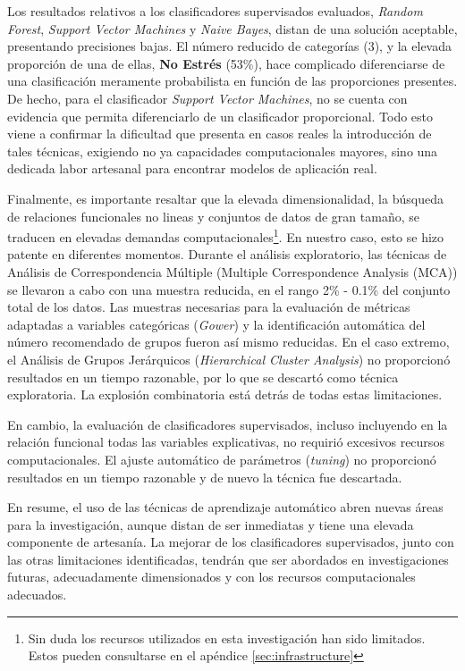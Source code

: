 \documentclass[a4paper, 11pt]{article}
\begin{document}
Los resultados relativos a los clasificadores supervisados evaluados, \textit{Random Forest}, 
\textit{Support Vector Machines} y \textit{Naive Bayes}, distan de una solución aceptable,
presentando precisiones bajas. El número reducido de categorías (3), y la elevada proporción
de una de ellas, \textbf{No Estrés} (53\%), hace complicado diferenciarse de una clasificación
meramente probabilista en función de las proporciones presentes. De hecho, para el 
clasificador \textit{Support Vector Machines}, no se cuenta con evidencia que permita 
diferenciarlo de un clasificador proporcional. Todo esto viene a confirmar la dificultad 
que presenta en casos reales la introducción de tales técnicas, exigiendo no ya capacidades
computacionales mayores, sino una dedicada labor artesanal para encontrar modelos de
aplicación real.

Finalmente, es importante resaltar que la elevada dimensionalidad, la búsqueda de relaciones
funcionales no lineas y conjuntos de datos de gran tamaño, se traducen en elevadas 
demandas computacionales\footnote{Sin duda los recursos utilizados en esta investigación
han sido limitados. Estos pueden consultarse en el apéndice \ref{sec:infrastructure}}.
En nuestro caso, esto se hizo patente en diferentes momentos. Durante el análisis
exploratorio, las técnicas de  Análisis de Correspondencia Múltiple (Multiple
Correspondence Analysis (MCA)) se llevaron a cabo con una muestra reducida, en el 
rango 2\% - 0.1\% del conjunto total de los datos. Las muestras necesarias para la
evaluación de métricas adaptadas a variables categóricas (\textit{Gower}) y la
identificación automática del número recomendado de grupos fueron así mismo reducidas. 
En el caso extremo, el Análisis de Grupos Jerárquicos (\textit{Hierarchical Cluster
Analysis}) no proporcionó resultados en un tiempo razonable, por lo que se descartó
como técnica exploratoria. La explosión combinatoria está detrás de todas estas limitaciones.

En cambio, la evaluación de clasificadores supervisados, incluso incluyendo en la 
relación funcional todas las variables explicativas, no requirió excesivos recursos 
computacionales. El ajuste automático de parámetros (\textit{tuning}) no proporcionó
resultados en un tiempo razonable y de nuevo la técnica fue descartada. 

En resume, el uso de las técnicas de aprendizaje automático abren nuevas áreas para 
la investigación, aunque distan de ser inmediatas y tiene una elevada componente de 
artesanía. La mejorar de los clasificadores supervisados, junto con las otras limitaciones 
identificadas, tendrán que ser abordados en investigaciones futuras, adecuadamente
dimensionados y con los recursos computacionales adecuados.
\end{document}
